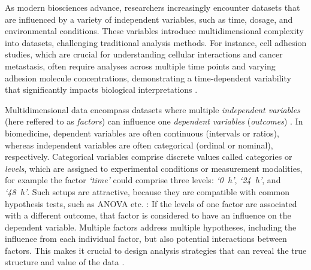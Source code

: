 

%
\label{sec:intro_multidimensional_data}%
As modern biosciences advance, researchers increasingly encounter datasets that
are influenced by a variety of independent variables, such as time, dosage, and
environmental conditions. These variables introduce multidimensional complexity
into datasets, challenging traditional analysis methods. For instance, cell
adhesion studies, which are crucial for understanding cellular interactions and
cancer metastasis, often require analyses across multiple time points and
varying adhesion molecule concentrations, demonstrating a time-dependent
variability that significantly impacts biological interpretations
\cite{reblTimedependentMetabolicActivity2010, mckayCellcellAdhesionMolecules1997,bolado-carrancioPeriodicPropagatingWaves2020a}.


Multidimensional data encompass datasets where multiple \emph{independent
    variables} (here reffered to as \emph{factors}) can influence one
\emph{dependent variables} (\emph{outcomes}) \cite{krzywinskiMultidimensionalData2013}.
In biomedicine, dependent variables are often continuous (intervals or ratios),
whereas independent variables are often categorical (ordinal or nominal),
respectively. Categorical variables comprise discrete values called categories
or \emph{levels}, which are assigned to experimental conditions or measurement
modalities, for example the factor \textit{`time'} could comprise three
\linebreak levels: \textit{`\SI{0}{\hour}'}, \textit{`\SI{24}{\hour}'}, and
\textit{`\SI{48}{\hour}'}. Such setups are attractive, because they are
compatible with common hypothesis tests, such as ANOVA etc.
\cite{motulskyIntuitiveBiostatisticsNonmathematical2018}: If the levels of one
factor are associated with a different outcome, that factor is considered to
have an influence on the dependent variable. Multiple factors address multiple
hypotheses, including the influence from each individual factor, but also
potential interactions between factors. This makes it crucial to design analysis
strategies that can reveal the true structure and value of the data
\cite{krzywinskiMultidimensionalData2013}.


